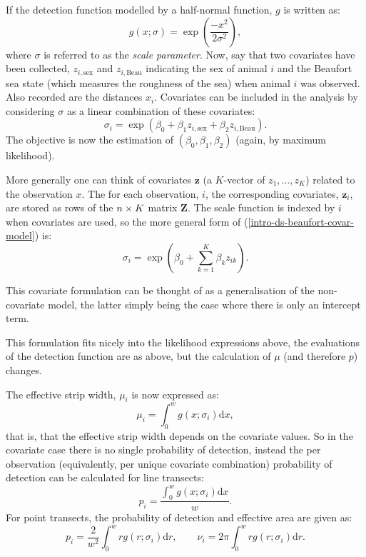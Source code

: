If the detection function modelled by a half-normal function, $g$ is written as:
\begin{equation*}
g(x; \sigma) = \exp\left (\frac{-x^2}{2\sigma^2}\right ),
\end{equation*}
where $\sigma$ is referred to as the \textit{scale parameter}. Now, say that two covariates have been collected, $z_{i,\text{sex}}$ and $z_{i,\text{Beau}}$ indicating the sex of animal $i$ and the Beaufort sea state (which measures the roughness of the sea) when animal $i$ was observed. Also recorded are the distances $x_i$. Covariates can be included in the analysis by considering $\sigma$ as a linear combination of these covariates:
\begin{equation}
\sigma_i = \exp( \beta_0 + \beta_1 z_{i,\text{sex}} + \beta_2 z_{i,\text{Beau}}).
\label{intro-ds-beaufort-covar-model}
\end{equation}
The objective is now the estimation of $(\beta_0, \beta_1, \beta_2)$ (again, by maximum likelihood).

More generally one can think of covariates $\mathbf{z}$ (a $K$-vector of $z_1, \dots, z_K$) related to the observation $x$. The for each observation, $i$, the corresponding covariates, $\mathbf{z}_i$, are stored as rows of the $n \times K$ matrix $\mathbf{Z}$. The scale function is indexed by $i$ when covariates are used, so the more general form of (\ref{intro-ds-beaufort-covar-model}) is:
\begin{equation}
\sigma_{i} = \exp( \beta_{0} + \sum_{k=1}^K \beta_k z_{ik}).
\label{intro-ds-covar-model}
\end{equation}

This covariate formulation can be thought of as a generalisation of the non-covariate model, the latter simply being the case where there is only an intercept term. 

This formulation fits nicely into the likelihood expressions above, the evaluations of the detection function are as above, but the calculation of $\mu$ (and therefore $p$) changes. 

The effective strip width, $\mu_i$ is now expressed as:
\begin{equation}
\mu_i = \int_0^w g(x ; \sigma_i) \text{d}x,
\label{intro-ds-mu-covar}
\end{equation}
that is, that the effective strip width depends on the covariate values. So in the covariate case there is no single probability of detection, instead the per observation (equivalently, per unique covariate combination) probability of detection can be calculated for line transects:
\begin{equation*}
p_i = \frac{\int_0^w g(x ; \sigma_{i}) \text{d}x}{w}.
\end{equation*}
For point transects, the probability of detection and effective area are given as:
\begin{equation*}
p_i =\frac{2}{w^2}\int_0^w r g(r; \sigma_i) \text{d}r, \qquad \nu_i = 2\pi \int_0^w r g(r; \sigma_i) \text{d}r.
\end{equation*}

